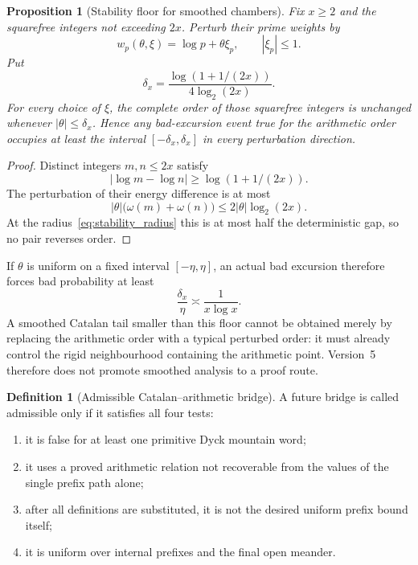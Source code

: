 \documentclass[11pt]{amsart}
\numberwithin{equation}{section}
\theoremstyle{plain}
\newtheorem{proposition}[theorem]{Proposition}
\theoremstyle{definition}
\newtheorem{definition}[theorem]{Definition}
\theoremstyle{remark}
\begin{document}
\begin{proposition}[Stability floor for smoothed chambers]
\label{prop:stability_floor}
Fix $x\geq2$ and the squarefree integers not exceeding $2x$.  Perturb their
prime weights by
\begin{equation}
w_p(\theta,\xi)=\log p+\theta\xi_p,
\qquad |\xi_p|\leq1.
\end{equation}
Put
\begin{equation}
\delta_x=
\frac{\log(1+1/(2x))}{4\log_2(2x)}.
\label{eq:stability_radius}
\end{equation}
For every choice of $\xi$, the complete order of those squarefree integers is
unchanged whenever $|\theta|\leq\delta_x$.  Hence any bad-excursion event true
for the arithmetic order occupies at least the interval
$[-\delta_x,\delta_x]$ in every perturbation direction.
\end{proposition}

\begin{proof}
Distinct integers $m,n\leq2x$ satisfy
\begin{equation}
|\log m-\log n|\geq\log(1+1/(2x)).
\end{equation}
The perturbation of their energy difference is at most
\begin{equation}
|\theta|\bigl(\omega(m)+\omega(n)\bigr)
\leq2|\theta|\log_2(2x).
\end{equation}
At the radius~\eqref{eq:stability_radius} this is at most half the deterministic
gap, so no pair reverses order.
\end{proof}

If $\theta$ is uniform on a fixed interval $[-\eta,\eta]$, an actual bad
excursion therefore forces bad probability at least
\begin{equation}
\frac{\delta_x}{\eta}\asymp\frac1{x\log x}.
\label{eq:stability_probability_floor}
\end{equation}
A smoothed Catalan tail smaller than this floor cannot be obtained merely by
replacing the arithmetic order with a typical perturbed order: it must already
control the rigid neighbourhood containing the arithmetic point.  Version~5
therefore does not promote smoothed analysis to a proof route.

\begin{definition}[Admissible Catalan--arithmetic bridge]
\label{def:admissible_bridge}
A future bridge is called admissible only if it satisfies all four tests:
\begin{enumerate}[label=(\roman*)]
\item it is false for at least one primitive Dyck mountain word;
\item it uses a proved arithmetic relation not recoverable from the values of
      the single prefix path alone;
\item after all definitions are substituted, it is not the desired uniform
      prefix bound itself;
\item it is uniform over internal prefixes and the final open meander.
\end{enumerate}
\end{definition}
\end{document}
